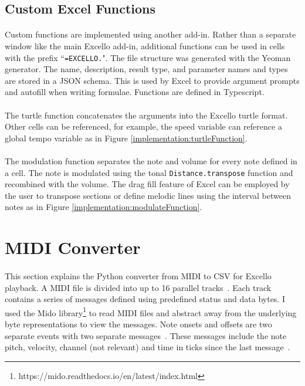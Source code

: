 \subsection{Custom Excel Functions}\label{Custom Excel Functions}

\paragraph{} Custom functions are implemented using another add-in. Rather than a separate window like the main Excello add-in, additional functions can be used in cells with the prefix ``\texttt{=EXCELLO.}". The file structure was generated with the Yeoman generator. The name, description, result type, and parameter names and types are stored in a JSON schema. This is used by Excel to provide argument prompts and autofill when writing formulae. Functions are defined in Typescript.

\paragraph{} The turtle function concatenates the arguments into the Excello turtle format. Other cells can be referenced, for example, the speed variable can reference a global tempo variable as in Figure \ref{implementation:turtleFunction}.

\paragraph{} The modulation function separates the note and volume for every note defined in a cell. The note is modulated using the tonal \texttt{Distance.transpose} function and recombined with the volume. The drag fill feature of Excel can be employed by the user to transpose sections or define melodic lines using the interval between notes as in Figure \ref{implementation:modulateFunction}.

\section{MIDI Converter}

\paragraph{} This section explains the Python converter from MIDI to CSV for Excello playback. A MIDI file is divided into up to 16 parallel tracks~\cite{midiSpec}. Each track contains a series of messages defined using predefined status and data bytes. I used the Mido library\footnote{https://mido.readthedocs.io/en/latest/index.html} to read MIDI files and abstract away from the underlying byte representations to view the messages. Note onsets and offsets are two separate events with two separate messages~\cite{midiSpec}. These messages include the note pitch, velocity, channel (not relevant) and time in ticks since the last message~\cite{midoSpec}.

